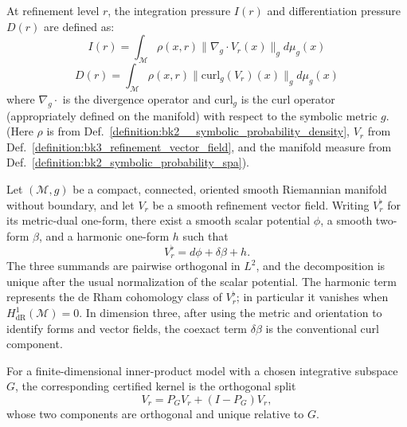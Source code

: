 \begin{definition} \label{definition:bk3_integration_differentiation_pressures}
At refinement level $r$, the integration pressure $I(r)$ and differentiation pressure $D(r)$ are defined as:
\[
I(r) = \int_{\mathcal{M}} \rho(x,r) \|\nabla_g \cdot V_r(x)\|_g d\mu_g(x)
\]
\[
D(r) = \int_{\mathcal{M}} \rho(x,r) \|\text{curl}_g(V_r)(x)\|_g d\mu_g(x)
\]
where $\nabla_g \cdot$ is the divergence operator and $\text{curl}_g$ is the curl operator (appropriately defined on the manifold) with respect to the symbolic metric $g$. (Here $\rho$ is from Def.~\ref{definition:bk2__symbolic_probability_density}, $V_r$ from Def.~\ref{definition:bk3_refinement_vector_field}, and the manifold measure from Def.~\ref{definition:bk2_symbolic_probability_spa}).
\end{definition}

\begin{lemma}
\label{lemma:bk3_helmholtz_decomposition_refinement_field}
Let $(\mathcal{M},g)$ be a compact, connected, oriented smooth Riemannian
manifold without boundary, and let $V_r$ be a smooth refinement vector field.
Writing $V_r^\flat$ for its metric-dual one-form, there exist a smooth scalar
potential $\phi$, a smooth two-form $\beta$, and a harmonic one-form $h$ such
that
\begin{equation}
V_r^\flat=d\phi+\delta\beta+h.
\end{equation}
The three summands are pairwise orthogonal in $L^2$, and the decomposition is
unique after the usual normalization of the scalar potential.  The harmonic
term represents the de Rham cohomology class of $V_r^\flat$; in particular it
vanishes when $H^1_{\mathrm{dR}}(\mathcal{M})=0$.  In dimension three, after
using the metric and orientation to identify forms and vector fields, the
coexact term $\delta\beta$ is the conventional curl component.

For a finite-dimensional inner-product model with a chosen integrative
subspace $G$, the corresponding certified kernel is the orthogonal split
\begin{equation}
V_r=P_GV_r+(I-P_G)V_r,
\end{equation}
whose two components are orthogonal and unique relative to $G$.
\end{lemma}

